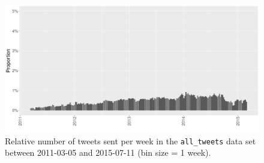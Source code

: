 \documentclass[11pt, a4paper,twoside]{report}\usepackage[]{graphicx}\usepackage[]{color}
\begin{document}
\begin{figure}[H]
\centering
\includegraphics[width=1\linewidth]{activity_total_date_Twitter_full_aggregated.png}
\caption{Relative number of tweets sent per week in the \texttt{all\_tweets} data set between 2011-03-05 and 2015-07-11 (bin size = 1 week).}
\label{fig:tweets_seasonal_full}
\end{figure}
\end{document}
